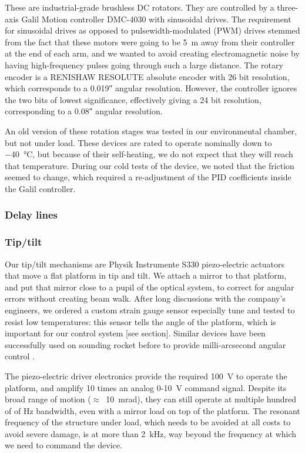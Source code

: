 These are industrial-grade brushless DC rotators. They are controlled by a three-axis Galil Motion controller DMC-4030 with sinusoidal drives. The requirement for sinusoidal drives as opposed to pulsewidth-modulated (PWM) drives stemmed from the fact that these motors were going to be \SI{5}{\meter} away from their controller at the end of each arm, and we wanted to avoid creating electromagnetic noise by having high-frequency pulses going through such a large distance. The rotary encoder is a RENISHAW RESOLUTE absolute encoder with 26 bit resolution, which corresponds to a \ang{;;0.019} angular resolution. However, the controller ignores the two bits of lowest significance, effectively giving a 24 bit resolution, corresponding to a \ang{;;0.08} angular resolution.

An old version of these rotation stages was tested in our environmental chamber, but not under load. These devices are rated to operate nominally down to \SI{-40}{\celsius}, but because of their self-heating, we do not expect that they will reach that temperature. During our cold tests of the device, we noted that the friction seemed to change, which required a re-adjustment of the PID coefficients inside the Galil controller. 

\subsubsection{Delay lines}
\subsubsection{Tip/tilt}

Our tip/tilt mechanisms are Physik Instrumente S330 piezo-electric actuators that move a flat platform in tip and tilt. We attach a mirror to that platform, and put that mirror close to a pupil of the optical system, to correct for angular errors without creating beam walk. After long discussions with the company's engineers, we ordered a custom strain gauge sensor especially tune and tested to resist low temperatures: this sensor tells the angle of the platform, which is important for our control system [see section]. Similar devices have been successfully used on sounding rocket before to provide milli-arcsecond angular control \citep{Mendillo:2012fh}. 

The piezo-electric driver electronics provide the required \SI{100}{\volt} to operate the platform, and amplify 10 times an analog 0-10~\si{\volt} command signal. Despite its broad range of motion ($\approx$~\SI{10}{\milli\radian}), they can still operate at multiple hundred of of \si{\hertz} bandwidth, even with a mirror load on top of the platform. The resonant frequency of the structure under load, which needs to be avoided at all costs to avoid severe damage, is at more than \SI{2}{\kilo\hertz}, way beyond the frequency at which we need to command the device.

